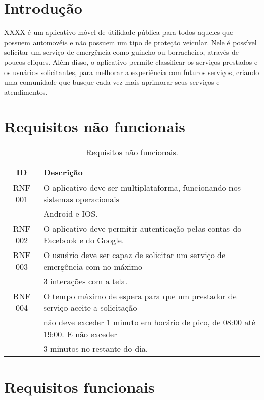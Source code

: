 \documentclass{article}
\begin{document}
\section{Introdução}
XXXX é um aplicativo móvel de útilidade pública para todos aqueles que possuem automovéis e não possuem um tipo de proteção veícular. Nele é possível solicitar um serviço de emergência como guincho ou borracheiro, através de poucos cliques. Além disso, o aplicativo permite classificar os serviços prestados e os usuários solicitantes, para melhorar a experiência com futuros serviços, criando uma comunidade que busque cada vez mais aprimorar seus serviços e atendimentos. 

\section{Requisitos não funcionais}

\begin{table}[h!]
  \begin{center}
    \caption{Requisitos não funcionais.}
    \label{tab:table1}
    \begin{tabular}{|c|l|} 
      \hline
      \textbf{ID} & \textbf{Descrição}\\
      \hline
      RNF 001 & O aplicativo deve ser multiplataforma, funcionando             nos sistemas operacionais \\ 
              & Android e IOS. \\
      \hline
      RNF 002 & O aplicativo deve permitir autenticação pelas contas           do Facebook e do Google. \\
      \hline
      RNF 003 & O usuário deve ser capaz de solicitar um serviço de            emergência com no máximo \\
              & 3 interações com a tela. \\
      \hline
      RNF 004 & O tempo máximo de espera para que um prestador de              serviço aceite a solicitação \\
              & não deve exceder 1                minuto em horário    de pico, de 08:00 até 19:00. E não           exceder \\
              & 3 minutos no restante do dia. \\
     \hline
    \end{tabular}
  \end{center}
\end{table}

\section{Requisitos funcionais}
\end{document}
